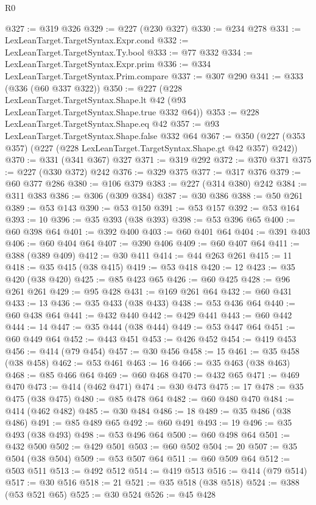 \begin{lexlean}{R0}
\begin{coremodule}
@327 := @319 @326
@329 := @227 (@230 @327)
@330 := @234 @278
@331 := LexLeanTarget.TargetSyntax.Expr.cond
@332 := LexLeanTarget.TargetSyntax.Ty.bool
@333 := @77 @332
@334 := LexLeanTarget.TargetSyntax.Expr.prim
@336 := @334 LexLeanTarget.TargetSyntax.Prim.compare
@337 := @307 @290
@341 := @333 (@336 (@60 @337 @322))
@350 := @227
    (@228
      LexLeanTarget.TargetSyntax.Shape.lt
      @42
      (@93 LexLeanTarget.TargetSyntax.Shape.true @332 @64))
@353 := @228 LexLeanTarget.TargetSyntax.Shape.eq @42
@357 := @93 LexLeanTarget.TargetSyntax.Shape.false @332 @64
@367 := @350 (@227 (@353 @357) (@227 (@228 LexLeanTarget.TargetSyntax.Shape.gt @42 @357) @242))
@370 := @331 (@341 @367) @327
@371 := @319 @292
@372 := @370 @371
@375 := @227 (@330 @372) @242
@376 := @329 @375
@377 := @317 @376
@379 := @60 @377 @286
@380 := @106 @379
@383 := @227 (@314 @380) @242
@384 := @311 @383
@386 := @306 (@309 @384)
@387 := @30 @386
@388 := @50 @261
@389 := @53 @143
@390 := @53 @150
@391 := @53 @157
@392 := @53 @164
@393 := 10
@396 := @35 @393 (@38 @393)
@398 := @53 @396 @65
@400 := @60 @398 @64
@401 := @392 @400
@403 := @60 @401 @64
@404 := @391 @403
@406 := @60 @404 @64
@407 := @390 @406
@409 := @60 @407 @64
@411 := @388 (@389 @409)
@412 := @30 @411
@414 := @44 @263 @261
@415 := 11
@418 := @35 @415 (@38 @415)
@419 := @53 @418
@420 := 12
@423 := @35 @420 (@38 @420)
@425 := @85 @423 @65
@426 := @60 @425
@428 := @96 @261 @261
@429 := @95 @428
@431 := @169 @261 @64
@432 := @60 @431
@433 := 13
@436 := @35 @433 (@38 @433)
@438 := @53 @436 @64
@440 := @60 @438 @64
@441 := @432 @440
@442 := @429 @441
@443 := @60 @442
@444 := 14
@447 := @35 @444 (@38 @444)
@449 := @53 @447 @64
@451 := @60 @449 @64
@452 := @443 @451
@453 := @426 @452
@454 := @419 @453
@456 := @414 (@79 @454)
@457 := @30 @456
@458 := 15
@461 := @35 @458 (@38 @458)
@462 := @53 @461
@463 := 16
@466 := @35 @463 (@38 @463)
@468 := @85 @466 @64
@469 := @60 @468
@470 := @432 @65
@471 := @469 @470
@473 := @414 (@462 @471)
@474 := @30 @473
@475 := 17
@478 := @35 @475 (@38 @475)
@480 := @85 @478 @64
@482 := @60 @480 @470
@484 := @414 (@462 @482)
@485 := @30 @484
@486 := 18
@489 := @35 @486 (@38 @486)
@491 := @85 @489 @65
@492 := @60 @491
@493 := 19
@496 := @35 @493 (@38 @493)
@498 := @53 @496 @64
@500 := @60 @498 @64
@501 := @432 @500
@502 := @429 @501
@503 := @60 @502
@504 := 20
@507 := @35 @504 (@38 @504)
@509 := @53 @507 @64
@511 := @60 @509 @64
@512 := @503 @511
@513 := @492 @512
@514 := @419 @513
@516 := @414 (@79 @514)
@517 := @30 @516
@518 := 21
@521 := @35 @518 (@38 @518)
@524 := @388 (@53 @521 @65)
@525 := @30 @524
@526 := @45 @428

\end{coremodule}
\end{lexlean}
